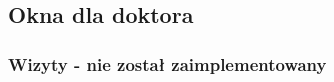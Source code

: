 \begin{flushleft}
    \subsection{\Large{Okna dla doktora}}
    \subsubsection{\large{Wizyty - nie został zaimplementowany}}
    
\end{flushleft}
